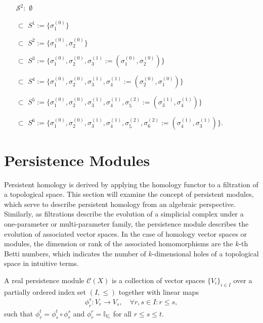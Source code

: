 \begin{example}{\cite[\S 2.2, Example]{de2011dualities}}
	\begin{itemize}
		\item[$\mathcal{S}^{2}:$] $\emptyset$
		\item[$\subset$] $S^{1} := \{\sigma_{1}^{(0)}\}$
		\item[$\subset$] $S^{2} := \{\sigma_{1}^{(0)}, \sigma_{2}^{(0)}\}$
		\item[$\subset$] $S^{3} := \{\sigma_{1}^{(0)}, \sigma_{2}^{(0)}, \sigma_{3}^{(1)} := (\sigma_{1}^{(0)}, \sigma_{2}^{(0)})\}$
		\item[$\subset$] $S^{4} := \{\sigma_{1}^{(0)}, \sigma_{2}^{(0)}, \sigma_{3}^{(1)}, \sigma_{4}^{(1)} := (\sigma_{2}^{(0)}, \sigma_{1}^{(0)})\}$
		\item[$\subset$] $S^{5} := \{\sigma_{1}^{(0)}, \sigma_{2}^{(0)}, \sigma_{3}^{(1)}, \sigma_{4}^{(1)}, \sigma_{5}^{(2)} := (\sigma_{3}^{(1)}, \sigma_{4}^{(1)})\}$
		\item[$\subset$] $S^{6} := \{\sigma_{1}^{(0)}, \sigma_{2}^{(0)}, \sigma_{3}^{(1)}, \sigma_{4}^{(1)}, \sigma_{5}^{(2)}, \sigma_{6}^{(2)} := (\sigma_{4}^{(1)}, \sigma_{3}^{(1)})\}.$
	\end{itemize}
\end{example}
\vspace{0.2cm}

\section{Persistence Modules}
\label{PersistenceModules}
Persistent homology is derived by applying the homology functor to a filtration of a topological space. This section will examine the concept of persistent modules, which serve to describe persistent homology from an algebraic perspective. Similarly, as filtrations describe the evolution of a simplicial complex under a one-parameter or multi-parameter family, the persistence module describes the evolution of associated vector spaces. In the case of homology vector spaces or modules, the dimension or rank of the associated homomorphisms are the $k$-th Betti numbers, which indicates the number of $k$-dimensional holes of a topological space in intuitive terms.

\begin{definition}{\cite[\S 1.1]{chazal2016structure}}
A real persistence module $\mathcal{C}(X)$ is a collection of vector spaces $\{V_i\}_{i \in I}$ over a partially ordered index set $(I,\leq)$ together with linear maps
\begin{align}
\phi_{r}^{s}: V_r \rightarrow V_s, \quad \forall r,s \in I: r \leq s,
\end{align}
such that $\phi_{r}^{t} = \phi^{t}_{s} \circ \phi_{r}^{s}$ and $\phi_{r}^r = \mathbb{I}_{V_r}$ for all $r \leq s \leq t$.
\end{definition}

